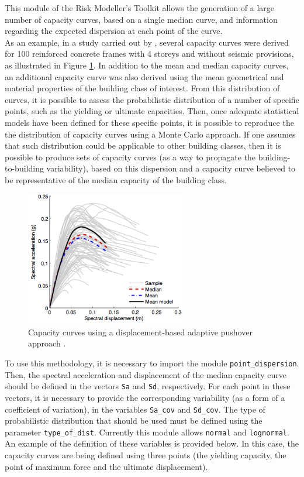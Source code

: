 This module of the Risk Modeller's Toolkit allows the generation of a large number of capacity curves, based on a single median curve, and information regarding the expected dispersion at each point of the curve. \\

As an example, in a study carried out by \cite{SilvaEtAl2014b}, several capacity curves were derived for 100 reinforced concrete frames with 4 storeys and without seismic provisions, as illustrated in Figure \ref{fig:set_cc}. In addition to the mean and median capacity curves, an additional capacity curve was also derived using the mean geometrical and material properties of the building class of interest. From this distribution of curves, it is possible to assess the probabilistic distribution of a number of specific points, such as the yielding or ultimate capacities. Then, once adequate statistical models have been defined for these specific points, it is possible to reproduce the the distribution of capacity curves using a Monte Carlo approach. If one assumes that such distribution could be applicable to other building classes, then it is possible to produce sets of capacity curves (as a way to propagate the building-to-building variability), based on this dispersion and a capacity curve believed to be representative of the median capacity of the building class.

\begin{figure}[htb]
  \centering
      \includegraphics[width=7cm]{Figures/set_capacity_curves.png}
  \caption{Capacity curves using a displacement-based adaptive pushover approach \citep{SilvaEtAl2014b}.}
  \label{fig:set_cc}
\end{figure}

To use this methodology, it is necessary to import the module \verb=point_dispersion=. Then, the spectral acceleration and displacement of the median capacity curve should be defined in the vectors \verb=Sa= and \verb=Sd=, respectively. For each point in these vectors, it is necessary to provide the corresponding variability (as a form of a coefficient of variation), in the variables \verb=Sa_cov= and \verb=Sd_cov=. The type of probabilistic distribution that should be used must be defined using the parameter \verb=type_of_dist=. Currently this module allows \verb=normal= and \verb=lognormal=. An example of the definition of these variables is provided below. In this case, the capacity curves are being defined using three points (the yielding capacity, the point of maximum force and the ultimate displacement).

